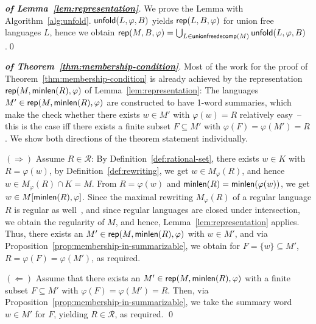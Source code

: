 \documentclass[envcountsame]{llncs}
\newcommand{\rationalset}{\ensuremath{\mathcal{R}}\xspace}
\newcommand{\representation}{\ensuremath{{\sf rep}}\xspace}
\newcommand{\unfold}{\ensuremath{{\sf unfold}}\xspace}
\newcommand{\minlength}{\ensuremath{{\sf minlen}}\xspace}
\newcommand{\unionfreerep}{\ensuremath{\mathsf{unionfreedecomp}}\xspace}
\begin{document}
\begin{proof}[\textbf{of Lemma~\ref{lem:representation}}]
  We prove the Lemma with Algorithm~\ref{alg:unfold}.
$\unfold(L,\varphi,B)$ yields $\representation(L,B,\varphi)$ for
  union free languages $L$, hence we obtain $\representation
  (M,B,\varphi)=\bigcup_{L\in\unionfreerep(M)}{\unfold(L,\varphi,B)}$.\qed
\end{proof}


\begin{proof}[\textbf{of Theorem~\ref{thm:membership-condition}}]
  Most of the work for the proof of
  Theorem~\ref{thm:membership-condition} is already achieved by the
  representation $\representation(M,\minlength(R),\varphi)$ of
  Lemma~\ref{lem:representation}:
The languages $M'\in \representation(M,\minlength(R),\varphi)$ are
  constructed to have 1-word summaries, which make the check whether
  there exists $w \in M'$ with $\varphi(w)=R$ relatively easy~-- this
  is the case iff there exists a finite subset $F\subseteq M'$ with
  $\varphi(F)=\varphi(M')=R$.
We show both directions of the theorem statement individually.


  $(\Rightarrow)$ Assume $R\in\rationalset$: By Definition~\ref{def:rational-set},
  there exists $w\in K$ with $R=\varphi(w)$, by
  Definition~\ref{def:rewriting}, we get $w\in M_\varphi(R)$, and
  hence $w\in M_\varphi(R)\cap K=M$.
From $R=\varphi(w)$ and $\minlength(R)=\minlength(\varphi(w))$, we
  get $w\in M[\minlength(R), \varphi]$.
Since the maximal rewriting $M_\varphi(R)$ of a regular language $R$
  is regular as well~\cite{rewriting}, and since regular languages are
  closed under intersection, we obtain the regularity of $M$, and
  hence, Lemma~\ref{lem:representation} applies.
Thus, there exists an $M'\in\representation(M,\minlength(R),\varphi)$ with
  $w\in M'$, and via
  Proposition~\ref{prop:membership-in-summarizable}, we obtain 
for $F=\{w\}\subseteq M'$, $R=\varphi(F)=\varphi(M')$, as required.


  $(\Leftarrow)$ Assume that there exists an $M'\in
  \representation(M,\minlength(R),\varphi)$ with a finite subset $F\subseteq
  M'$ with $\varphi(F)=\varphi(M')=R$.
Then, via Proposition~\ref{prop:membership-in-summarizable}, we take
  the summary word $w\in M'$ for $F$, yielding $R\in\rationalset$, as
  required. \qed
\end{proof}
\end{document}
